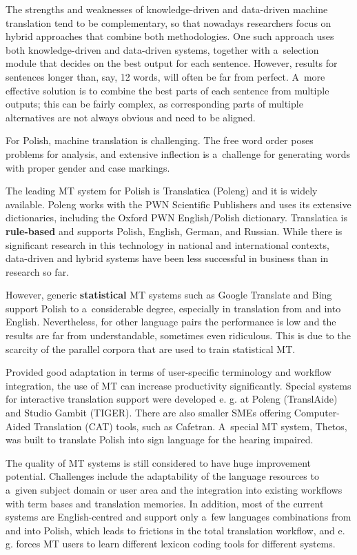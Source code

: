 \begin{multicols}{2}
The strengths and weaknesses of knowledge-driven and data-driven
machine translation tend to be complementary, so that nowadays
researchers focus on hybrid approaches that combine both
methodologies. One such approach uses both knowledge-driven and
data-driven systems, together with a~selection module that decides on
the best output for each sentence. However, results for sentences
longer than, say, 12 words, will often be far from perfect. A~more
effective solution is to combine the best parts of each sentence from
multiple outputs; this can be fairly complex, as corresponding parts
of multiple alternatives are not always obvious and need to be
aligned. 

For Polish, machine translation is challenging. The free word order
poses problems for analysis, and extensive inflection is a~challenge
for generating words with proper gender and case markings.


The leading MT system for Polish is Translatica (Poleng) and it is
widely available. Poleng works with the PWN Scientific Publishers and
uses its extensive dictionaries, including the Oxford PWN
English/Polish dictionary. Translatica is \textbf{rule-based} and
supports Polish, English, German, and Russian. While there is
significant research in this technology in national and international
contexts, data-driven and hybrid systems have been less successful in
business than in research so far. 

However, generic \textbf{statistical} MT systems such as Google
Translate and Bing support Polish to a~considerable degree, especially
in translation from and into English. Nevertheless, for other language
pairs the performance is low and the results are far from
understandable, sometimes even ridiculous. This is due to the scarcity
of the parallel corpora that are used to train statistical MT. 

Provided good adaptation in terms of user-specific terminology and
workflow integration, the use of MT can increase productivity
significantly. Special systems for interactive translation support
were developed e. g. at Poleng (TranslAide) and Studio Gambit (TIGER).
There are also smaller SMEs offering Computer-Aided Translation (CAT)
tools, such as Cafetran. A~special MT system, Thetos, was built to
translate Polish into sign language for the hearing impaired. 

The quality of MT systems is still considered to have huge improvement
potential. Challenges include the adaptability of the language
resources to a~given subject domain or user area and the integration
into existing workflows with term bases and translation memories. In
addition, most of the current systems are English-centred and support
only a~few languages combinations from and into Polish, which leads to
frictions in the total translation workflow, and e. g. forces MT users
to learn different lexicon coding tools for different systems. 


\end{multicols}
